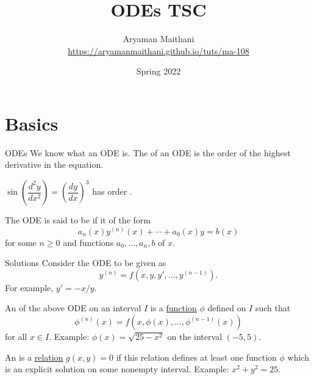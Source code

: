 \documentclass[dvipsnames]{beamer}
\title{ODEs TSC}
\author[Aryaman Maithani]{\texorpdfstring{Aryaman Maithani\\\url{https://aryamanmaithani.github.io/tuts/ma-108}}{Aryaman Maithani}}
\date{Spring 2022}
\institute{IIT Bombay}
\theoremstyle{definition}
\let\ge\geqslant
\begin{document}
\begin{frame}
    \titlepage
\end{frame}



\section{Basics}

\begin{frame}{ODEs}
    We know what an ODE is. \pause The  of an ODE is the order of the highest derivative in the equation. \pause

    $\sin\left(\dfrac{d^{2}y}{dx^{2}}\right) = \left(\dfrac{dy}{dx}\right)^{3}$ has order \underline{\phantom{hello}}. \pause

    The ODE is said to be  if it of the form
    \begin{equation*} 
      a_{n}(x) y^{(n)}(x) + \cdots + a_{0}(x) y = b(x) 
    \end{equation*}
    for some $n \ge 0$ and functions $a_{0}, \ldots, a_{n}, b$ of $x$. 
\end{frame}
\begin{frame}{Solutions}
  Consider the ODE to be given as
  \begin{equation*} 
    y^{(n)} = f(x, y, y', \ldots, y^{(n - 1)}).
  \end{equation*} \pause
  For example, $y' = -x/y$. \pause

  An  of the above ODE on an interval $I$ is a \underline{function} $\phi$ defined on $I$ \pause such that 
  \begin{equation*} 
    \phi^{(n)}(x) = f(x, \phi(x), \ldots, \phi^{(n - 1)}(x))
  \end{equation*}
  for all $x \in I$. \pause Example: $\phi(x) = \sqrt{25 - x^{2}}$ on the interval $(-5, 5)$. \pause

  An  is a \underline{relation} $g(x, y) = 0$ \pause if this relation defines at least one function $\phi$ which is an explicit solution on some nonempty interval. \pause Example: $x^{2} + y^{2} = 25$.
\end{frame}
\end{document}
